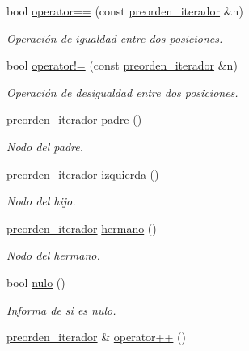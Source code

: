 \begin{DoxyCompactItemize}
\item 
bool \hyperlink{classArbolGeneral_1_1preorden__iterador_a40ce7061c6632d2c83d31ac7d7eb5772}{operator==} (const \hyperlink{classArbolGeneral_1_1preorden__iterador}{preorden\-\_\-iterador} \&n)
\begin{DoxyCompactList}\small\item\em Operación de igualdad entre dos posiciones. \end{DoxyCompactList}\item 
bool \hyperlink{classArbolGeneral_1_1preorden__iterador_a10082c5dc98b2878518a8d49032056a7}{operator!=} (const \hyperlink{classArbolGeneral_1_1preorden__iterador}{preorden\-\_\-iterador} \&n)
\begin{DoxyCompactList}\small\item\em Operación de desigualdad entre dos posiciones. \end{DoxyCompactList}\item 
\hyperlink{classArbolGeneral_1_1preorden__iterador}{preorden\-\_\-iterador} \hyperlink{classArbolGeneral_1_1preorden__iterador_af6da79d49b40e79f7e8108bea80d15dd}{padre} ()
\begin{DoxyCompactList}\small\item\em Nodo del padre. \end{DoxyCompactList}\item 
\hyperlink{classArbolGeneral_1_1preorden__iterador}{preorden\-\_\-iterador} \hyperlink{classArbolGeneral_1_1preorden__iterador_adb5df08e17d808c2cc730d8652265422}{izquierda} ()
\begin{DoxyCompactList}\small\item\em Nodo del hijo. \end{DoxyCompactList}\item 
\hyperlink{classArbolGeneral_1_1preorden__iterador}{preorden\-\_\-iterador} \hyperlink{classArbolGeneral_1_1preorden__iterador_ae112223697d9ffc1cdb9454436a8acd1}{hermano} ()
\begin{DoxyCompactList}\small\item\em Nodo del hermano. \end{DoxyCompactList}\item 
bool \hyperlink{classArbolGeneral_1_1preorden__iterador_a41286b60f0285afb9852679acb42c0b6}{nulo} ()
\begin{DoxyCompactList}\small\item\em Informa de si es nulo. \end{DoxyCompactList}\item 
\hyperlink{classArbolGeneral_1_1preorden__iterador}{preorden\-\_\-iterador} \& \hyperlink{classArbolGeneral_1_1preorden__iterador_a6ce61fb0ab8c1b0aa3bd91266618eeb5}{operator++} ()

\end{DoxyCompactItemize}
